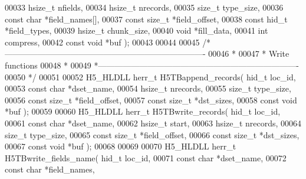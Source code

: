\begin{DoxyCode}
00033                        hsize\_t nfields,
00034                        hsize\_t nrecords,
00035                        \textcolor{keywordtype}{size\_t} type\_size,
00036                        \textcolor{keyword}{const} \textcolor{keywordtype}{char} *field\_names[],
00037                        \textcolor{keyword}{const} \textcolor{keywordtype}{size\_t} *field\_offset,
00038                        \textcolor{keyword}{const} hid\_t *field\_types,
00039                        hsize\_t chunk\_size,
00040                        \textcolor{keywordtype}{void} *fill\_data,
00041                        \textcolor{keywordtype}{int} compress,
00042                        \textcolor{keyword}{const} \textcolor{keywordtype}{void} *buf );
00043 
00044 
00045 \textcolor{comment}{/*-------------------------------------------------------------------------}
00046 \textcolor{comment}{ *}
00047 \textcolor{comment}{ * Write functions}
00048 \textcolor{comment}{ *}
00049 \textcolor{comment}{ *-------------------------------------------------------------------------}
00050 \textcolor{comment}{ */}
00051 
00052 H5\_HLDLL herr\_t  H5TBappend\_records( hid\_t loc\_id,
00053                            \textcolor{keyword}{const} \textcolor{keywordtype}{char} *dset\_name,
00054                            hsize\_t nrecords,
00055                            \textcolor{keywordtype}{size\_t} type\_size,
00056                            \textcolor{keyword}{const} \textcolor{keywordtype}{size\_t} *field\_offset,
00057                            \textcolor{keyword}{const} \textcolor{keywordtype}{size\_t} *dst\_sizes,
00058                            \textcolor{keyword}{const} \textcolor{keywordtype}{void} *buf );
00059 
00060 H5\_HLDLL herr\_t  H5TBwrite\_records( hid\_t loc\_id,
00061                           \textcolor{keyword}{const} \textcolor{keywordtype}{char} *dset\_name,
00062                           hsize\_t start,
00063                           hsize\_t nrecords,
00064                           \textcolor{keywordtype}{size\_t} type\_size,
00065                           \textcolor{keyword}{const} \textcolor{keywordtype}{size\_t} *field\_offset,
00066                           \textcolor{keyword}{const} \textcolor{keywordtype}{size\_t} *dst\_sizes,
00067                           \textcolor{keyword}{const} \textcolor{keywordtype}{void} *buf );
00068 
00069 
00070 H5\_HLDLL herr\_t  H5TBwrite\_fields\_name( hid\_t loc\_id,
00071                               \textcolor{keyword}{const} \textcolor{keywordtype}{char} *dset\_name,
00072                               \textcolor{keyword}{const} \textcolor{keywordtype}{char} *field\_names,

\end{DoxyCode}
